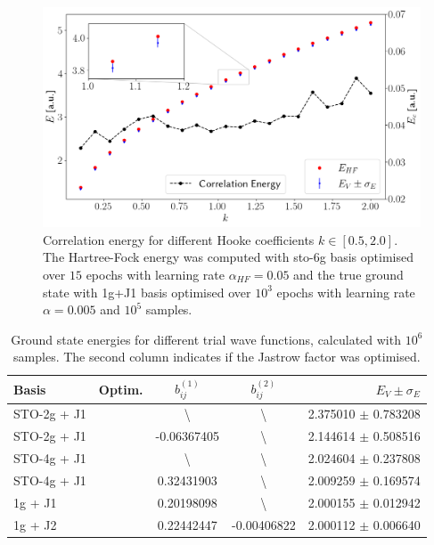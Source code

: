 \documentclass[final,3p,times,twocolumn]{elsarticle}
\newcommand{\cmark}{\ding{51}}%
\newcommand{\xmark}{\ding{55}}%
\begin{document}
	\begin{figure}[h]
	\centering
	\includegraphics[width=\linewidth]{../plots/corrPlot.png}
	\caption{Correlation energy for different Hooke coefficients $k \in [0.5, 2.0]$. The Hartree-Fock energy was computed with sto-6g basis optimised over $15$ epochs with learning rate $\alpha_{HF} = 0.05$ and the true ground state with 1g+J1 basis optimised over $10^3$ epochs with learning rate $\alpha=0.005$ and $10^5$ samples.}
	\label{fig:correng}
	\end{figure}

	\begin{table}
		\centering
		\begin{tabular}{@{}lcccr@{}} 
			\toprule
			Basis & Optim. & $b^{(1)}_{ij}$ & $b^{(2)}_{ij}$ & $E_V \pm \sigma_E$\\ \midrule
			STO-2g + J1 & \xmark & \textbackslash & \textbackslash & 2.375010 $\pm$ 0.783208 \\ 
			STO-2g + J1 & \cmark & -0.06367405 & \textbackslash & 2.144614 $\pm$ 0.508516\\ 
			STO-4g + J1 & \xmark & \textbackslash & \textbackslash & 2.024604 $\pm$ 0.237808 \\ 
			STO-4g + J1 & \cmark & 0.32431903 & \textbackslash & 2.009259 $\pm$ 0.169574\\ 
			1g + J1 	& \cmark & 0.20198098 & \textbackslash & 2.000155 $\pm$ 0.012942\\ 
			1g + J2 	& \cmark & 0.22442447 & -0.00406822 & 2.000112 $\pm$ 0.006640\\ 
			\bottomrule
		\end{tabular}
		\caption{Ground state energies for different trial wave functions, calculated with $10^6$ samples. The second column indicates if the Jastrow factor was optimised.}
	\end{table}
\end{document}
